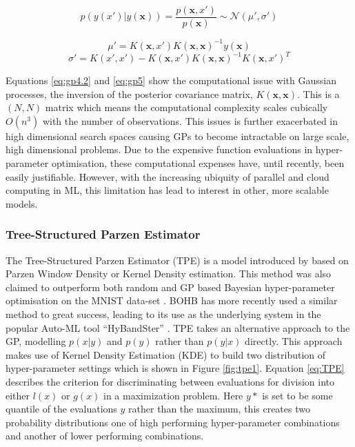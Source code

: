\documentclass{article}
\begin{document}


			\begin{equation}\label{eq:gp4.1}p(y(x')|y(\bm{x})) = \frac{p(\bm{x},x')}{p(\bm{x})} \sim  \mathcal{N} (\mu',\sigma') \end{equation}



			\begin{equation}\label{eq:gp4.2}\mu' = K(\bm{x},x')K(\bm{x},\bm{x})^{-1}y(\bm{x})\end{equation}
			\begin{equation} \label{eq:gp5}\sigma' = K(x',x') - K(\bm{x},x')K(\bm{x},\bm{x})^{-1}K(\bm{x},x')^T \end{equation}



			Equations \ref{eq:gp4.2} and \ref{eq:gp5} show the computational issue with Gaussian processes, the inversion of the posterior covariance matrix, \(K(\bm{x},\bm{x})\). This is a \((N,N)\) matrix which means the computational complexity scales cubically \(O(n^3)\) with the number of observations. This issues is further exacerbated in high dimensional search spaces causing GPs to become intractable on large scale, high dimensional problems. Due to the expensive function evaluations in hyper-parameter optimisation, these computational expenses have, until recently, been easily justifiable. However, with the increasing ubiquity of parallel and cloud computing in ML, this limitation has lead to interest in other, more scalable models.


		\subsubsection{Tree-Structured Parzen Estimator}

			The Tree-Structured Parzen Estimator (TPE) is a model introduced by \cite{20} based on Parzen Window Density or Kernel Density estimation. This method was also claimed to outperform both random and GP based Bayesian hyper-parameter optimisation on the MNIST data-set \cite{20}. BOHB\cite{32} has more recently used a similar method to great success, leading to its use as the underlying system in the popular Auto-ML tool “HyBandSter” \cite{34}.
			TPE takes an alternative approach to the GP, modelling \(p(x|y)\) and \(p(y)\) rather than \(p(y|x)\) directly. This approach makes use of Kernel Density Estimation (KDE) to build two distribution of hyper-parameter settings which is shown in Figure \ref{fig:tpe1}. Equation \ref{eq:TPE} describes the criterion for discriminating between evaluations for division into either \(l(x)\) or \(g(x)\) in a maximization problem. Here \(y*\) is set to be some quantile of the evaluations \(y\) rather than the maximum, this creates two probability distributions one of high performing hyper-parameter combinations and another of lower performing combinations. 
\end{document}
